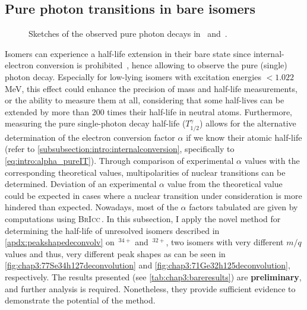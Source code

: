 \subsection{Pure photon transitions in bare isomers}\label{subsec:chap3:purephoton}
\begin{figure}[hbt]
  \centering
  \hspace{0.7cm}
  \caption{Sketches of the observed pure photon decays in \, and \,.}
  \label{fig:chap3:sketches_bareisomers}
\end{figure}
Isomers can experience a half-life extension in their bare state since internal-electron conversion is prohibited~\cite{Litvinov-2003}, hence allowing to observe the pure (single) photon decay. Especially for low-lying isomers with excitation energies $<1.022$\,MeV, this effect could enhance the precision of mass and half-life measurements, or the ability to measure them at all, considering that some half-lives can be extended by more than $200$ times their half-life in neutral atoms. 
Furthermore, measuring the pure single-photon decay half-life ($T_{1/2}^{\gamma}$) allows for the alternative determination of the electron conversion factor $\alpha$ if we know their atomic half-life (refer to \cref{subsubsection:intro:internalconversion}, specifically to \cref{eq:intro:alpha_pureIT}).
\newpar
Through comparison of experimental $\alpha$ values with the corresponding theoretical values, multipolarities of nuclear transitions can be determined. 
Deviation of an experimental $\alpha$ value from the theoretical value could be expected in cases where a nuclear transition under consideration is more hindered than expected. Nowadays, most of the $\alpha$ factors tabulated are given by computations using \textsc{BrIcc}\,\cite{KIBEDI2008202}.
\newpar
In this subsection, I apply the novel method for determining the half-life of unresolved isomers described in \cref{apdx:peakshapedeconvolv} on \,$^{34+}$ and \,$^{32+}$, two isomers with very different $m/q$ values and thus, very different peak shapes as can be seen in \cref{fig:chap3:77Se34h127deconvolution} and \cref{fig:chap3:71Ge32h125deconvolution}, respectively. The results presented (see \cref{tab:chap3:bareresults}) are \textbf{preliminary}, and further analysis is required. Nonetheless, they provide sufficient evidence to demonstrate the potential of the method.

